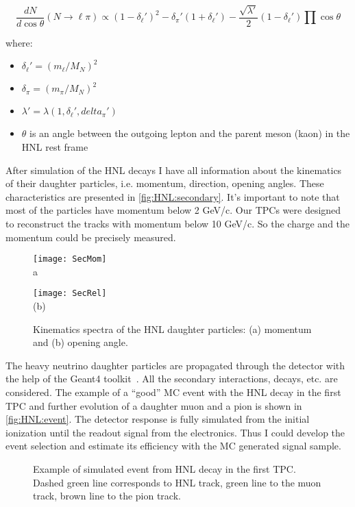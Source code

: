 \documentclass[../main.tex]{subfiles}
\begin{document}
\begin{equation}
    \frac{dN}{d\cos\theta}\left(N\to\ell\pi\right)\propto\left(1-\delta_\ell'\right)^2-\delta_\pi'\left(1+\delta_\ell'\right)-\frac{\sqrt{\lambda'}}{2}\left(1-\delta_\ell'\right)\prod\cos\theta
\end{equation}

where:
\begin{itemize}
    \item $\delta_\ell'=\left(m_\ell/M_N\right)^2$
    \item $\delta_\pi=\left(m_\pi/M_N\right)^2$
    \item $\lambda'=\lambda\left(1, \delta_\ell', delta_\pi'\right)$
    \item $\theta$ is an angle between the outgoing lepton and the parent meson (kaon) in the HNL rest frame
\end{itemize}


After simulation of the HNL decays I have all information about the kinematics of their daughter particles, i.e. momentum, direction, opening angles. These characteristics are presented in \autoref{fig:HNL:secondary}. It's important to note that most of the particles have momentum below 2 GeV/c. Our TPCs were designed to reconstruct the tracks with momentum below 10 GeV/c. So the charge and the momentum could be precisely measured.

\begin{figure}[!ht]
    \begin{minipage}{0.49\linewidth}
        \centering
        \texttt{[image: SecMom]} \\ {a}
    \end{minipage}
    \begin{minipage}{0.49\linewidth}
    \texttt{[image: SecRel]} \\ (b)

    \end{minipage}
        \caption{Kinematics spectra of the HNL daughter particles: (a) momentum and (b) opening angle.}
    \label{fig:HNL:secondary}
\end{figure}

The heavy neutrino daughter particles are propagated through the detector with the help of the Geant4 toolkit~\cite{Agostinelli2003}. All the secondary interactions, decays, etc. are considered. The example of a ``good'' MC event with the HNL decay in the first TPC and further evolution of a daughter muon and a pion is shown in \autoref{fig:HNL:event}. The detector response is fully simulated from the initial ionization until the readout signal from the electronics. Thus I could develop the event selection and estimate its efficiency with the MC generated signal sample.
\begin{figure}[!ht]
    \caption{Example of simulated event from HNL decay in the first TPC. Dashed green line corresponds to HNL track, green line to the muon track, brown line to the pion track.}
    \label{fig:HNL:event}
\end{figure}
\end{document}

